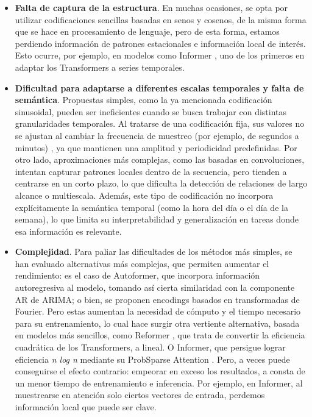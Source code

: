 \begin{itemize}
	\item \textbf{Falta de captura de la estructura}. En muchas ocasiones, se opta por utilizar codificaciones sencillas basadas en senos y cosenos, de la misma forma que se hace en procesamiento de lenguaje, pero de esta forma, estamos perdiendo información de patrones estacionales e información local de interés. Esto ocurre, por ejemplo, en modelos como Informer \cite{zhou2021informerefficienttransformerlong}, uno de los primeros en adaptar los Transformers a series temporales.

	\item \textbf{Dificultad para adaptarse a diferentes escalas temporales y falta de semántica}. Propuestas simples, como la ya mencionada codificación sinusoidal, pueden ser ineficientes cuando se busca trabajar con distintas granularidades temporales. Al tratarse de una codificación fija, sus valores no se ajustan al cambiar la frecuencia de muestreo (por ejemplo, de segundos a minutos) , ya que mantienen una amplitud y periodicidad predefinidas. Por otro lado, aproximaciones más complejas, como las basadas en convoluciones, intentan capturar patrones locales dentro de la secuencia, pero tienden a centrarse en un corto plazo, lo que dificulta la detección de relaciones de largo alcance o multiescala. Además, este tipo de codificación no incorpora explícitamente la semántica temporal (como la hora del día o el día de la semana), lo que limita su interpretabilidad y generalización en tareas donde esa información es relevante.
	

	\item \textbf{Complejidad}. Para paliar las dificultades de los métodos más simples, se han evaluado alternativas más complejas, que permiten aumentar el rendimiento: es el caso de Autoformer, que incorpora información autoregresiva al modelo, tomando así cierta similaridad con la componente AR de ARIMA; o bien, se proponen encodings basados en transformadas de Fourier. Pero estas aumentan la necesidad de cómputo y el tiempo necesario para su entrenamiento, lo cual hace surgir otra vertiente alternativa, basada en modelos más sencillos, como Reformer \cite{kitaev2020reformerefficienttransformer}, que trata de convertir la eficiencia cuadrática de los Transformers, a lineal. O Informer, que persigue lograr eficiencia \textit{n log n} mediante su ProbSparse Attention \cite{zhou2021informerefficienttransformerlong}. Pero, a veces puede conseguirse el efecto contrario: empeorar en exceso los resultados, a consta de un menor tiempo de entrenamiento e inferencia. Por ejemplo, en Informer, al muestrearse en atención solo ciertos vectores de entrada, perdemos información local que puede ser clave.
\end{itemize}


